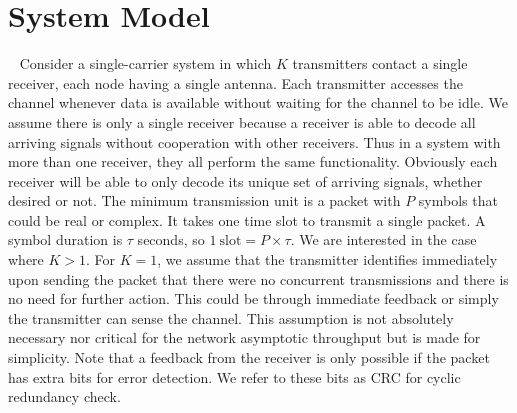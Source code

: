 \documentclass[10pt, a4paper, twocolumn]{IEEEtran}
\begin{document}
\section{System Model}~\label{sec2}
Consider a single-carrier system in which $K$ transmitters contact a single receiver, each node having a single antenna. Each transmitter accesses the channel whenever data is available without waiting for the channel to be idle. We assume there is only a single receiver because a receiver is able to decode all arriving signals without cooperation with other receivers. Thus in a system with more than one receiver, they all perform the same functionality. Obviously each receiver will be able to only decode its unique set of arriving signals, whether desired or not. The minimum transmission unit is a packet with $P$ symbols that could be real or complex. It takes one time slot to transmit a single packet. A symbol duration is $\tau$ seconds, so $1~\text{slot} = P\times \tau$. We are interested in the case where $K>1$. For $K=1$, we assume that the transmitter identifies immediately upon sending the packet that there were no concurrent transmissions and there is no need for further action. This could be through immediate feedback or simply the transmitter can sense the channel. This assumption is not absolutely necessary nor critical for the network asymptotic throughput but is made for simplicity. Note that a feedback from the receiver is only possible if the packet has extra bits for error detection. We refer to these bits as CRC for cyclic redundancy check.\\
\end{document}
